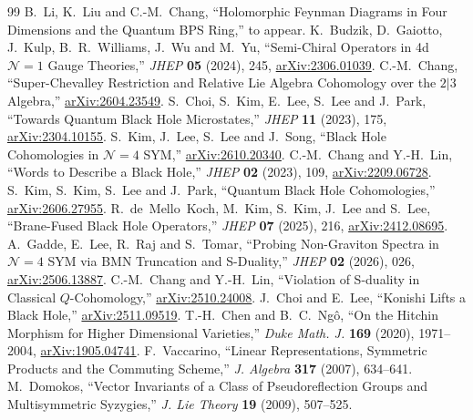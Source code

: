 \documentclass[11pt]{article}
\numberwithin{equation}{section}
\numberwithin{figure}{section}
\numberwithin{table}{section}
\begin{document}
\begin{thebibliography}{99}
\small
{}
B.~Li, K.~Liu and C.-M.~Chang, ``Holomorphic Feynman Diagrams in Four Dimensions and the Quantum BPS Ring,'' to appear.
K.~Budzik, D.~Gaiotto, J.~Kulp, B.~R.~Williams, J.~Wu and M.~Yu, ``Semi-Chiral Operators in 4d $\mathcal N=1$ Gauge Theories,'' \emph{JHEP} \textbf{05} (2024), 245, \href{https://arxiv.org/abs/2306.01039}{arXiv:2306.01039}.
C.-M.~Chang, ``Super-Chevalley Restriction and Relative Lie Algebra Cohomology over the $2|3$ Algebra,'' \href{https://arxiv.org/abs/2604.23549}{arXiv:2604.23549}.
S.~Choi, S.~Kim, E.~Lee, S.~Lee and J.~Park, ``Towards Quantum Black Hole Microstates,'' \emph{JHEP} \textbf{11} (2023), 175, \href{https://arxiv.org/abs/2304.10155}{arXiv:2304.10155}.
S.~Kim, J.~Lee, S.~Lee and J.~Song, ``Black Hole Cohomologies in $\mathcal N=4$ SYM,'' \href{https://arxiv.org/abs/2610.20340}{arXiv:2610.20340}.
C.-M.~Chang and Y.-H.~Lin, ``Words to Describe a Black Hole,'' \emph{JHEP} \textbf{02} (2023), 109, \href{https://arxiv.org/abs/2209.06728}{arXiv:2209.06728}.
S.~Kim, S.~Kim, S.~Lee and J.~Park, ``Quantum Black Hole Cohomologies,'' \href{https://arxiv.org/abs/2606.27955}{arXiv:2606.27955}.
R.~de~Mello~Koch, M.~Kim, S.~Kim, J.~Lee and S.~Lee, ``Brane-Fused Black Hole Operators,'' \emph{JHEP} \textbf{07} (2025), 216, \href{https://arxiv.org/abs/2412.08695}{arXiv:2412.08695}.
A.~Gadde, E.~Lee, R.~Raj and S.~Tomar, ``Probing Non-Graviton Spectra in $\mathcal N=4$ SYM via BMN Truncation and S-Duality,'' \emph{JHEP} \textbf{02} (2026), 026, \href{https://arxiv.org/abs/2506.13887}{arXiv:2506.13887}.
C.-M.~Chang and Y.-H.~Lin, ``Violation of S-duality in Classical $Q$-Cohomology,'' \href{https://arxiv.org/abs/2510.24008}{arXiv:2510.24008}.
J.~Choi and E.~Lee, ``Konishi Lifts a Black Hole,'' \href{https://arxiv.org/abs/2511.09519}{arXiv:2511.09519}.
T.-H.~Chen and B.~C.~Ng\^o, ``On the Hitchin Morphism for Higher Dimensional Varieties,'' \emph{Duke Math. J.} \textbf{169} (2020), 1971--2004, \href{https://arxiv.org/abs/1905.04741}{arXiv:1905.04741}.
F.~Vaccarino, ``Linear Representations, Symmetric Products and the Commuting Scheme,'' \emph{J. Algebra} \textbf{317} (2007), 634--641.
M.~Domokos, ``Vector Invariants of a Class of Pseudoreflection Groups and Multisymmetric Syzygies,'' \emph{J. Lie Theory} \textbf{19} (2009), 507--525.

\end{thebibliography}
\end{document}
